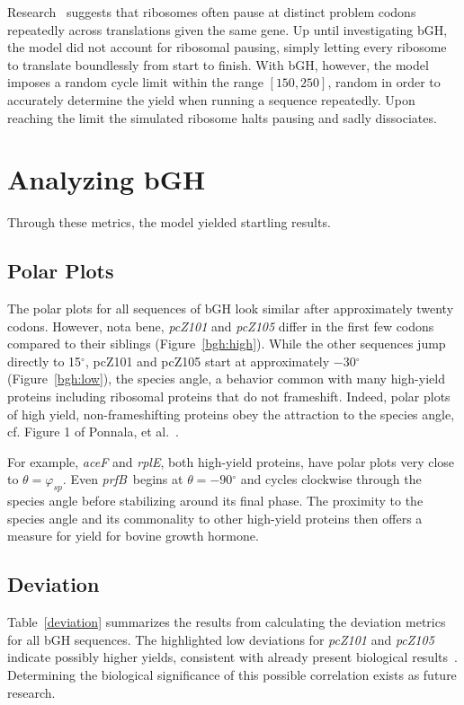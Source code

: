 \documentclass[10pt,twocolumn]{article}
\newcommand{\degree}{\ensuremath{^\circ}}
\newcommand{\prfB}{\emph{prfB}}
\begin{document}
Research~\cite{gowri:pause} suggests that ribosomes often pause at distinct problem codons repeatedly
across translations given the same gene. Up until investigating bGH, the model did not
account for ribosomal pausing, simply letting every ribosome to translate boundlessly from start to finish. With
bGH, however, the model imposes a random cycle limit within the range $[150,250]$, random in order to accurately
determine the yield when running a sequence repeatedly. Upon reaching the limit the simulated ribosome
halts pausing and sadly dissociates.

\section{Analyzing bGH}

Through these metrics, the model yielded startling results.

\subsection{Polar Plots}

The polar plots for all sequences of bGH look similar after approximately twenty codons.  
However, nota bene, \emph{pcZ101} and \emph{pcZ105} differ in the first few codons compared to
their siblings (Figure~\ref{bgh:high}).
While the other sequences jump directly to 15$\degree$, pcZ101 and pcZ105 start at approximately $-30\degree$
(Figure~\ref{bgh:low}),
the species angle, a behavior common with many high-yield proteins including ribosomal proteins that do not
frameshift. Indeed, polar plots of high yield, non-frameshifting proteins obey the attraction to the species
angle, cf. Figure 1 of Ponnala, et al.~\cite{lalit:mechanics}.

For example, \emph{aceF} and \emph{rplE}, both high-yield proteins, have polar plots very close to $\theta = \varphi_{sp}$.
Even \prfB\ begins at $\theta = -90\degree$ and cycles clockwise through the species angle before
stabilizing around its final phase. The proximity to the species angle and its commonality to
other high-yield proteins then offers a measure for yield for bovine growth hormone.


\subsection{Deviation}

Table~\ref{deviation} summarizes the results from calculating the deviation metrics 
for all bGH sequences. The highlighted low deviations for \emph{pcZ101} and {\it pcZ105}
indicate possibly higher yields, consistent with already present biological results~\cite{schoner:bgh}.
Determining the biological significance of this possible correlation exists as future research.
\end{document}
